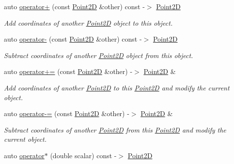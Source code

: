 \begin{DoxyCompactItemize}
auto \hyperlink{classprogrammers_1_1geometry_1_1Point2D_a8eec206395faf46be2b4e3048aa5ac31}{operator+} (const \hyperlink{classprogrammers_1_1geometry_1_1Point2D}{Point2D} \&other) const -\/$>$ \hyperlink{classprogrammers_1_1geometry_1_1Point2D}{Point2D}
\begin{DoxyCompactList}\small\item\em Add coordinates of another \hyperlink{classprogrammers_1_1geometry_1_1Point2D}{Point2D} object to this object. \end{DoxyCompactList}\item 
auto \hyperlink{classprogrammers_1_1geometry_1_1Point2D_a3b2cf6b925ad0dd8c2b91e67e66cdab5}{operator-\/} (const \hyperlink{classprogrammers_1_1geometry_1_1Point2D}{Point2D} \&other) const -\/$>$ \hyperlink{classprogrammers_1_1geometry_1_1Point2D}{Point2D}
\begin{DoxyCompactList}\small\item\em Subtract coordinates of another \hyperlink{classprogrammers_1_1geometry_1_1Point2D}{Point2D} object from this object. \end{DoxyCompactList}\item 
auto \hyperlink{classprogrammers_1_1geometry_1_1Point2D_a75796b7e8ddf7b854958d7265f13a2d6}{operator+=} (const \hyperlink{classprogrammers_1_1geometry_1_1Point2D}{Point2D} \&other) -\/$>$ \hyperlink{classprogrammers_1_1geometry_1_1Point2D}{Point2D} \&
\begin{DoxyCompactList}\small\item\em Add coordinates of another \hyperlink{classprogrammers_1_1geometry_1_1Point2D}{Point2D} to this \hyperlink{classprogrammers_1_1geometry_1_1Point2D}{Point2D} and modify the current object. \end{DoxyCompactList}\item 
auto \hyperlink{classprogrammers_1_1geometry_1_1Point2D_a8fd22e413a3145b405cbb66184236ffb}{operator-\/=} (const \hyperlink{classprogrammers_1_1geometry_1_1Point2D}{Point2D} \&other) -\/$>$ \hyperlink{classprogrammers_1_1geometry_1_1Point2D}{Point2D} \&
\begin{DoxyCompactList}\small\item\em Subtract coordinates of another \hyperlink{classprogrammers_1_1geometry_1_1Point2D}{Point2D} from this \hyperlink{classprogrammers_1_1geometry_1_1Point2D}{Point2D} and modify the current object. \end{DoxyCompactList}\item 
auto \hyperlink{classprogrammers_1_1geometry_1_1Point2D_a5dcc2f602f94d4ebfa71f8d98be3909e}{operator$\ast$} (double scalar) const -\/$>$ \hyperlink{classprogrammers_1_1geometry_1_1Point2D}{Point2D}

\end{DoxyCompactItemize}
